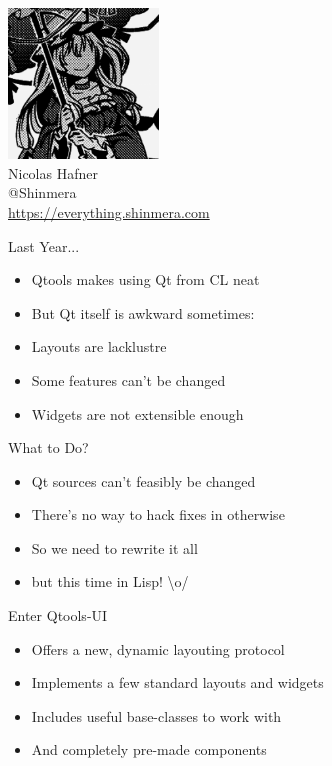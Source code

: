 \documentclass[14pt]{beamer}
\newcommand{\toptitle}[1]{
  {\huge #1} \\
  \vspace{0.2cm}
}
\begin{document}
\begin{frame}
  \begin{center}
    \includegraphics[height=4cm]{avatar.png}\\
    \vspace{0.2cm}
    {\Large Nicolas Hafner} \\
    \vspace{0.2cm}
    {\Huge @Shinmera} \\
    \vspace{0.2cm}
    \url{https://everything.shinmera.com}
  \end{center}
\end{frame}

\begin{frame}
  \toptitle{Last Year...}
  \begin{itemize}
  \item Qtools makes using Qt from CL neat
    \pause
  \item But Qt itself is awkward sometimes:
  \item Layouts are lacklustre
  \item Some features can't be changed
  \item Widgets are not extensible enough
  \end{itemize}
\end{frame}

\begin{frame}
  \toptitle{What to Do?}
  \begin{itemize}
  \item Qt sources can't feasibly be changed
  \item There's no way to hack fixes in otherwise
    \pause
  \item So we need to rewrite it all
  \item but this time in Lisp! \pause \quad\textbackslash o/
  \end{itemize}
\end{frame}

\begin{frame}
  \toptitle{Enter Qtools-UI}
  \begin{itemize}
  \item Offers a new, dynamic layouting protocol
  \item Implements a few standard layouts and widgets
  \item Includes useful base-classes to work with
  \item And completely pre-made components
  \end{itemize}
\end{frame}
\end{document}
